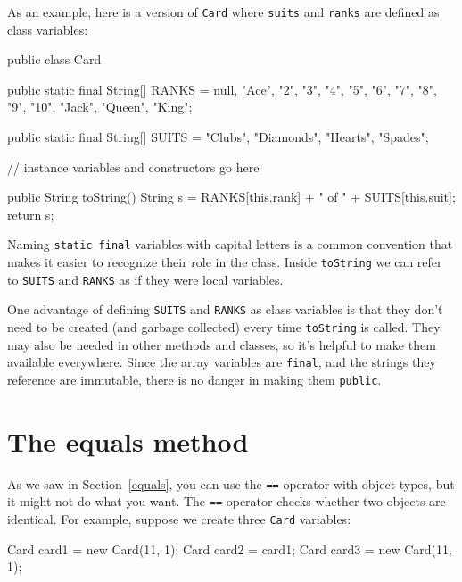 \documentclass[12pt]{book}
\theoremstyle{exercise}
\newcommand{\java}[1]{\verb"#1"}
\begin{document}

As an example, here is a version of \java{Card} where \java{suits} and \java{ranks} are defined as class variables:

\begin{code}
public class Card {

    public static final String[] RANKS = {
        null, "Ace", "2", "3", "4", "5", "6", "7",
        "8", "9", "10", "Jack", "Queen", "King"};

    public static final String[] SUITS = {
        "Clubs", "Diamonds", "Hearts", "Spades"};

    // instance variables and constructors go here

    public String toString() {
        String s = RANKS[this.rank] + " of " + SUITS[this.suit];
        return s;
    }
}
\end{code}

Naming \java{static final} variables with capital letters is a common convention that makes it easier to recognize their role in the class.
Inside \java{toString} we can refer to \java{SUITS} and \java{RANKS} as if they were local variables.

One advantage of defining \java{SUITS} and \java{RANKS} as class variables is that they don't need to be created (and garbage collected) every time \java{toString} is called.
They may also be needed in other methods and classes, so it's helpful to make them available everywhere.
Since the array variables are \java{final}, and the strings they reference are immutable, there is no danger in making them \java{public}.


\section{The equals method}
\label{equivalence}

As we saw in Section~\ref{equals}, you can use the \java{==} operator with object types, but it might not do what you want.
The \java{==} operator checks whether two objects are identical.
For example, suppose we create three \java{Card} variables:


\begin{code}
    Card card1 = new Card(11, 1);
    Card card2 = card1;
    Card card3 = new Card(11, 1);
\end{code}
\end{document}

